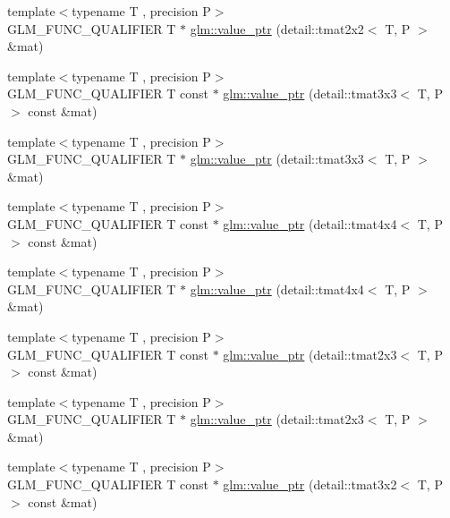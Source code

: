 \begin{DoxyCompactItemize}
\item 
{\footnotesize template$<$typename T , precision P$>$ }\\G\-L\-M\-\_\-\-F\-U\-N\-C\-\_\-\-Q\-U\-A\-L\-I\-F\-I\-E\-R T $\ast$ \hyperlink{group__gtc__type__ptr_ga11e5b6c0d7d5d2627df624bb4b219f20}{glm\-::value\-\_\-ptr} (detail\-::tmat2x2$<$ T, P $>$ \&mat)
\item 
{\footnotesize template$<$typename T , precision P$>$ }\\G\-L\-M\-\_\-\-F\-U\-N\-C\-\_\-\-Q\-U\-A\-L\-I\-F\-I\-E\-R T const $\ast$ \hyperlink{group__gtc__type__ptr_ga78acb1fd15ce7d1d2861493fac9693ec}{glm\-::value\-\_\-ptr} (detail\-::tmat3x3$<$ T, P $>$ const \&mat)
\item 
{\footnotesize template$<$typename T , precision P$>$ }\\G\-L\-M\-\_\-\-F\-U\-N\-C\-\_\-\-Q\-U\-A\-L\-I\-F\-I\-E\-R T $\ast$ \hyperlink{group__gtc__type__ptr_gaad64150511d5c6a2d2c7afec724e4064}{glm\-::value\-\_\-ptr} (detail\-::tmat3x3$<$ T, P $>$ \&mat)
\item 
{\footnotesize template$<$typename T , precision P$>$ }\\G\-L\-M\-\_\-\-F\-U\-N\-C\-\_\-\-Q\-U\-A\-L\-I\-F\-I\-E\-R T const $\ast$ \hyperlink{group__gtc__type__ptr_gaa99522f78635f6949ebf82f065bafa94}{glm\-::value\-\_\-ptr} (detail\-::tmat4x4$<$ T, P $>$ const \&mat)
\item 
{\footnotesize template$<$typename T , precision P$>$ }\\G\-L\-M\-\_\-\-F\-U\-N\-C\-\_\-\-Q\-U\-A\-L\-I\-F\-I\-E\-R T $\ast$ \hyperlink{group__gtc__type__ptr_ga46c85fe444b7260c496be5fe0c146e87}{glm\-::value\-\_\-ptr} (detail\-::tmat4x4$<$ T, P $>$ \&mat)
\item 
{\footnotesize template$<$typename T , precision P$>$ }\\G\-L\-M\-\_\-\-F\-U\-N\-C\-\_\-\-Q\-U\-A\-L\-I\-F\-I\-E\-R T const $\ast$ \hyperlink{group__gtc__type__ptr_gad5c4faad7a4553c875bc45656fcae73c}{glm\-::value\-\_\-ptr} (detail\-::tmat2x3$<$ T, P $>$ const \&mat)
\item 
{\footnotesize template$<$typename T , precision P$>$ }\\G\-L\-M\-\_\-\-F\-U\-N\-C\-\_\-\-Q\-U\-A\-L\-I\-F\-I\-E\-R T $\ast$ \hyperlink{group__gtc__type__ptr_gaaba8179ff5559d8b4493499313eb7a02}{glm\-::value\-\_\-ptr} (detail\-::tmat2x3$<$ T, P $>$ \&mat)
\item 
{\footnotesize template$<$typename T , precision P$>$ }\\G\-L\-M\-\_\-\-F\-U\-N\-C\-\_\-\-Q\-U\-A\-L\-I\-F\-I\-E\-R T const $\ast$ \hyperlink{group__gtc__type__ptr_gaf8edbe29063a5b8221fc8afcb6af224d}{glm\-::value\-\_\-ptr} (detail\-::tmat3x2$<$ T, P $>$ const \&mat)

\end{DoxyCompactItemize}
